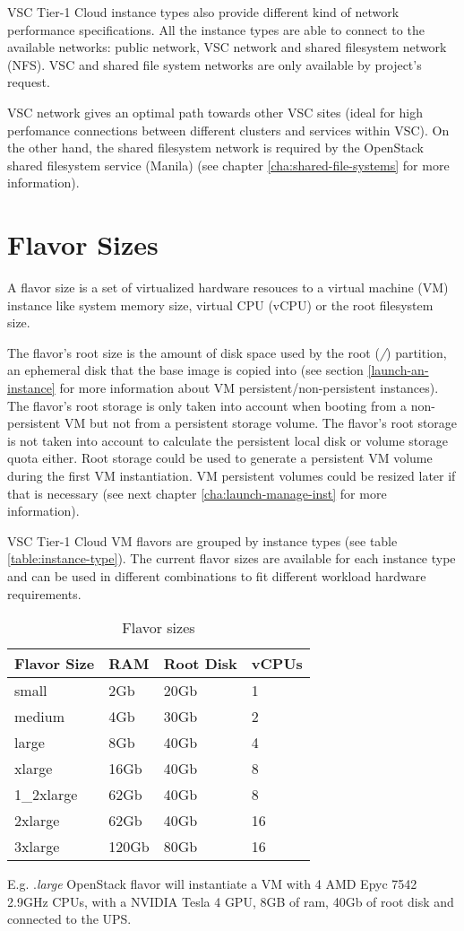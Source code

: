 VSC Tier-1 Cloud instance types also provide different kind of network
performance specifications. All the instance types are able to connect
to the available networks: public network, VSC network and shared filesystem
network (NFS). VSC and shared file system networks are only available
by project's request.

VSC network gives an optimal path towards other VSC sites (ideal for high
perfomance connections between different clusters and services within VSC).
On the other hand, the shared filesystem network is required by the OpenStack
shared filesystem service (Manila) (see chapter \ref{cha:shared-file-systems}
for more information).


\section{Flavor Sizes}\label{sec:flavor-sizes}
A flavor size is a set of virtualized hardware resouces to a virtual
machine (VM) instance like system memory size, virtual CPU (vCPU)
or the root filesystem size. 

The flavor's root size is the amount of disk space
used by the root (\emph{/}) partition, an ephemeral disk that the base image is copied into
(see section \ref{launch-an-instance} for more information about VM persistent/non-persistent
instances).
The flavor's root storage is only taken into account when booting from a non-persistent VM but not from a
persistent storage volume. The flavor's root storage is not taken into account to calculate
the persistent local disk or volume storage quota either. Root storage could be used to generate
a persistent VM volume during the first VM instantiation. VM persistent volumes could be resized
later if that is necessary (see next chapter \ref{cha:launch-manage-inst} for more information).

VSC Tier-1 Cloud VM flavors are grouped by instance types
(see table \ref{table:instance-type}). The current flavor sizes are
available for each instance type and can be used in different
combinations to fit different workload hardware requirements.

\begin{table}[h!]
\centering
\begin{tabular}{ |p{3cm}|p{3cm}|p{3cm}|p{3cm}| }
  \hline
  \rowcolor{lightgray} \textbf{Flavor Size} & \textbf{RAM} & \textbf{Root Disk} & \textbf{vCPUs} \\
  \hline
  small & 2Gb & 20Gb & 1 \\
  \hline
  medium & 4Gb & 30Gb & 2 \\
  \hline
  large & 8Gb & 40Gb & 4 \\
  \hline
  xlarge & 16Gb & 40Gb & 8 \\
  \hline
  1\_2xlarge & 62Gb & 40Gb & 8 \\
  \hline
  2xlarge & 62Gb & 40Gb & 16 \\
  \hline
  3xlarge & 120Gb & 80Gb & 16 \\
  \hline
\end{tabular}
\caption{Flavor sizes}
\label{table:flavor-size}
\end{table}

E.g. .\emph{large} OpenStack flavor will instantiate a
VM with 4 AMD Epyc 7542 2.9GHz CPUs, with a NVIDIA Tesla 4 GPU, 8GB
of ram, 40Gb of root disk and connected to the UPS.

